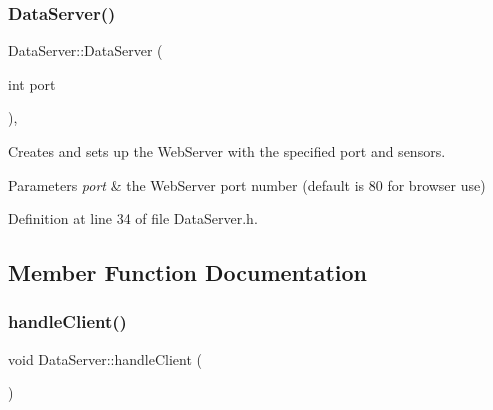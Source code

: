 \subsubsection{\texorpdfstring{DataServer()}{DataServer()}}
{\footnotesize\ttfamily Data\+Server\+::\+Data\+Server (\begin{DoxyParamCaption}\item[{int}]{port }\end{DoxyParamCaption})\hspace{0.3cm}{\ttfamily [inline]}, {\ttfamily [explicit]}}

Creates and sets up the Web\+Server with the specified port and sensors.


\begin{DoxyParams}{Parameters}
{\em port} & the Web\+Server port number (default is 80 for browser use) \\
\hline
\end{DoxyParams}


Definition at line 34 of file Data\+Server.\+h.


\begin{DoxyCode}{0}

\end{DoxyCode}


\subsection{Member Function Documentation}
\mbox{\label{classDataServer_a1bae1311f782108d515fe1127029dd2f}} 
\subsubsection{\texorpdfstring{handleClient()}{handleClient()}}
{\footnotesize\ttfamily void Data\+Server\+::handle\+Client (\begin{DoxyParamCaption}{ }\end{DoxyParamCaption})\hspace{0.3cm}{\ttfamily [inline]}}

